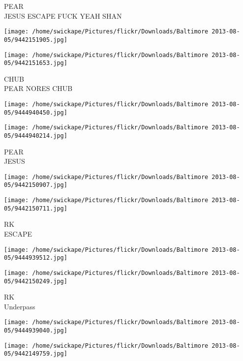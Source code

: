 \documentclass[10pt,letterpaper]{article}
\begin{document}
PEAR\\
JESUS ESCAPE FUCK YEAH SHAN\\
\pagebreak

\texttt{[image: /home/swickape/Pictures/flickr/Downloads/Baltimore 2013-08-05/9442151905.jpg]}

\vspace{0.25in}
\texttt{[image: /home/swickape/Pictures/flickr/Downloads/Baltimore 2013-08-05/9442151653.jpg]}

CHUB\\
PEAR NORES CHUB\\
\pagebreak

\texttt{[image: /home/swickape/Pictures/flickr/Downloads/Baltimore 2013-08-05/9444940450.jpg]}

\vspace{0.25in}
\texttt{[image: /home/swickape/Pictures/flickr/Downloads/Baltimore 2013-08-05/9444940214.jpg]}

PEAR\\
JESUS\\
\pagebreak

\texttt{[image: /home/swickape/Pictures/flickr/Downloads/Baltimore 2013-08-05/9442150907.jpg]}

\vspace{0.25in}
\texttt{[image: /home/swickape/Pictures/flickr/Downloads/Baltimore 2013-08-05/9442150711.jpg]}

RK\\
ESCAPE\\
\pagebreak

\texttt{[image: /home/swickape/Pictures/flickr/Downloads/Baltimore 2013-08-05/9444939512.jpg]}

\vspace{0.25in}
\texttt{[image: /home/swickape/Pictures/flickr/Downloads/Baltimore 2013-08-05/9442150249.jpg]}

RK\\
Underpass\\
\pagebreak

\texttt{[image: /home/swickape/Pictures/flickr/Downloads/Baltimore 2013-08-05/9444939040.jpg]}

\vspace{0.25in}
\texttt{[image: /home/swickape/Pictures/flickr/Downloads/Baltimore 2013-08-05/9442149759.jpg]}
\end{document}
